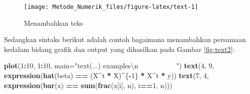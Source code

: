 \documentclass[]{book}
\newenvironment{Shaded}{\begin{snugshade}}{\end{snugshade}}
\newcommand{\CharTok}[1]{\textcolor[rgb]{0.31,0.60,0.02}{#1}}
\newcommand{\CommentTok}[1]{\textcolor[rgb]{0.56,0.35,0.01}{\textit{#1}}}
\newcommand{\DataTypeTok}[1]{\textcolor[rgb]{0.13,0.29,0.53}{#1}}
\newcommand{\DecValTok}[1]{\textcolor[rgb]{0.00,0.00,0.81}{#1}}
\newcommand{\FloatTok}[1]{\textcolor[rgb]{0.00,0.00,0.81}{#1}}
\newcommand{\KeywordTok}[1]{\textcolor[rgb]{0.13,0.29,0.53}{\textbf{#1}}}
\newcommand{\NormalTok}[1]{#1}
\newcommand{\OperatorTok}[1]{\textcolor[rgb]{0.81,0.36,0.00}{\textbf{#1}}}
\newcommand{\StringTok}[1]{\textcolor[rgb]{0.31,0.60,0.02}{#1}}
\theoremstyle{definition}
\theoremstyle{definition}
\theoremstyle{definition}
\theoremstyle{remark}
\begin{document}
\begin{Shaded}
\end{Shaded}

\begin{figure}

{\centering \texttt{[image: Metode\_Numerik\_files/figure-latex/text-1]} 

}

\caption{Menambahkan teks}\label{fig:text}
\end{figure}

Sedangkan sintaks berikut adalah contoh bagaimana menambahkan persamaan kedalam bidang grafik dan output yang dihasilkan pada Gambar \ref{fig:text2}:

\begin{Shaded}
\begin{Highlighting}[]
\KeywordTok{plot}\NormalTok{(}\DecValTok{1}\OperatorTok{:}\DecValTok{10}\NormalTok{, }\DecValTok{1}\OperatorTok{:}\DecValTok{10}\NormalTok{, }
     \DataTypeTok{main=}\StringTok{"text(...) examples}\CharTok{\textbackslash{}n}\StringTok{~~~~~~~~~~~"}\NormalTok{)}
\KeywordTok{text}\NormalTok{(}\DecValTok{4}\NormalTok{, }\DecValTok{9}\NormalTok{, }\KeywordTok{expression}\NormalTok{(}\KeywordTok{hat}\NormalTok{(beta) }\OperatorTok{==}\StringTok{ }\NormalTok{(X}\OperatorTok{^}\NormalTok{t }\OperatorTok{*}\StringTok{ }\NormalTok{X)}\OperatorTok{^}\NormalTok{\{}\OperatorTok{-}\DecValTok{1}\NormalTok{\} }\OperatorTok{*}\StringTok{ }\NormalTok{X}\OperatorTok{^}\NormalTok{t }\OperatorTok{*}\StringTok{ }\NormalTok{y))}
\KeywordTok{text}\NormalTok{(}\DecValTok{7}\NormalTok{, }\DecValTok{4}\NormalTok{, }\KeywordTok{expression}\NormalTok{(}\KeywordTok{bar}\NormalTok{(x) }\OperatorTok{==}\StringTok{ }\KeywordTok{sum}\NormalTok{(}\KeywordTok{frac}\NormalTok{(x[i], n), i}\OperatorTok{==}\DecValTok{1}\NormalTok{, n)))}
\end{Highlighting}
\end{Shaded}
\end{document}
